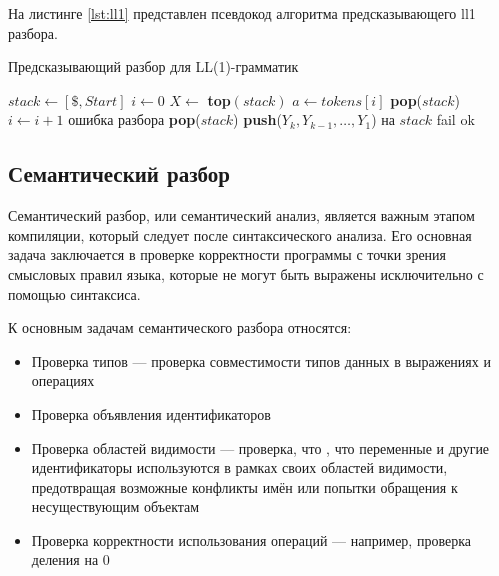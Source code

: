 \documentclass[14pt, russian]{scrartcl}
\begin{document}
На листинге \ref{lst:ll1} представлен псевдокод алгоритма предсказывающего ll1 разбора.

\begin{listing}
	\caption{Предсказывающий разбор для LL(1)-грамматик}
	\label{lst:ll1}
\begin{algorithm}[H]
	\begin{algorithmic}[1]
	  \State $stack \gets [\$, Start]$ 
	  \State $i \gets 0$
		\State $X \gets$ \textbf{top}$(stack)$
		\State $a \gets tokens[i]$
			 \State \textbf{pop}($stack$)
			 \State $i \gets i + 1$
		  \Else
			 \State \Return ошибка разбора
		  \EndIf
		\Else
			 \State \textbf{pop}($stack$)
			 \State \textbf{push}($Y_k, Y_{k-1}, \dots, Y_1$) на $stack$
		  \Else
			 \State \Return fail
		  \EndIf
		\EndIf
	  \EndWhile
	  \State \Return ok
	\EndProcedure
	\end{algorithmic}
\end{algorithm}
\end{listing}

\subsection{Семантический разбор}

Семантический разбор, или семантический анализ, является важным этапом компиляции, который следует
после синтаксического анализа. Его основная задача заключается в проверке корректности программы с
точки зрения смысловых правил языка, которые не могут быть выражены исключительно с помощью синтаксиса.

К основным задачам семантического разбора относятся:

\begin{itemize}
	\item Проверка типов --- проверка совместимости типов данных в выражениях и операциях
	\item Проверка объявления идентификаторов
	\item Проверка областей видимости --- проверка, что , что переменные и другие идентификаторы используются в
	рамках своих областей видимости, предотвращая возможные конфликты имён или попытки обращения к
	несуществующим объектам
	\item Проверка корректности использования операций --- например, проверка деления на 0
\end{itemize}
\end{document}
